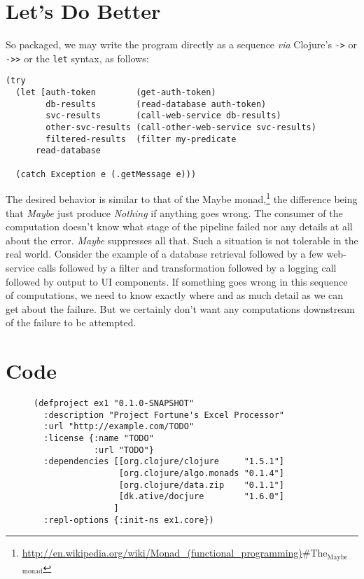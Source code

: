 \documentclass[11pt]{article}
\begin{document}
\section{Let's Do Better}
\label{sec-3}

So packaged, we may write the program
directly as a sequence \emph{via} Clojure's \verb|->| or \verb|->>| or
the \verb|let| syntax, as follows:

\begin{verbatim}
(try
  (let [auth-token        (get-auth-token)
        db-results        (read-database auth-token)
        svc-results       (call-web-service db-results)
        other-svc-results (call-other-web-service svc-results)
        filtered-results  (filter my-predicate 
      read-database

  (catch Exception e (.getMessage e)))
\end{verbatim}

The desired behavior is similar to that of the Maybe
monad,\footnote{\url{http://en.wikipedia.org/wiki/Monad_(functional_programming)}\#The$_{\text{Maybe}}$$_{\text{monad}}$}
the difference being that \emph{Maybe} just produce \emph{Nothing} if anything
goes wrong. The consumer of the computation doesn't know what stage
of the pipeline failed nor any details at all about the error.
\emph{Maybe} suppresses all that. Such a situation is not tolerable in
the real world. Consider the example of a database retrieval
followed by a few web-service calls followed by a filter and
transformation followed by a logging call followed by output to UI
components. If something goes wrong in this sequence of
computations, we need to know exactly where and as much detail as
we can get about the failure. But we certainly don't want any
computations downstream of the failure to be attempted.

\section{Code}
\label{sec-4}

\begin{figure}[H]
\label{project-file}
\begin{verbatim}
(defproject ex1 "0.1.0-SNAPSHOT"
  :description "Project Fortune's Excel Processor"
  :url "http://example.com/TODO"
  :license {:name "TODO"
            :url "TODO"}
  :dependencies [[org.clojure/clojure     "1.5.1"]
                 [org.clojure/algo.monads "0.1.4"]
                 [org.clojure/data.zip    "0.1.1"]
                 [dk.ative/docjure        "1.6.0"]
                ]
  :repl-options {:init-ns ex1.core})
\end{verbatim}
\end{figure}
\end{document}
